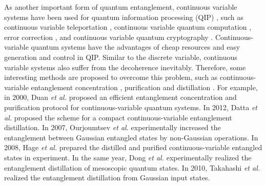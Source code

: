 \documentclass[preprintnumbers,showkeys,amsmath,amssymb]{revtex4}%
\begin{document}
As another important form of quantum entanglement, continuous
variable systems have been used for quantum information processing
(QIP) \cite{BraunsteinRMP77513}, such as continuous variable
teleportation \cite{VaidmanPRA1473,BraunsteinPRL869}, continuous
variable quantum computation \cite{LloydPRL1784}, error correction
\cite{BraunsteinNATURE394,LloydPRL4088}, and  continuous variable
quantum cryptography \cite{RalphPRA010302}. Continuous-variable
quantum systems have the advantages of cheap resources and easy
generation and control in QIP. Similar to the discrete variable,
continuous variable systems also suffer from the decoherence
inevitably. Therefore, some interesting methods are proposed to
overcome this problem, such as continuous-variable entanglement
concentration
\cite{LMDuanPRL2000,LMDuanPRA2000,Fiurasekpra022304,Menziespra042315,Menziespra062310,Tathampra14},
purification and distillation
\cite{LMDuanPRL2000,LMDuanPRA2000,Opatrnypra032302,Olivarespra032314,Dattaprl060502,Eisertny431,Kitagawapra042310,lundpra032309,Ourjoumtsevprl030502,HageNP915,DongNP919,
Takahashinp178}. For example, in 2000, Duan \emph{et al.}
\cite{LMDuanPRL2000} proposed an efficient entanglement
concentration and purification protocol for continuous-variable
quantum systems. In 2012, Datta \emph{et al.} \cite{Dattaprl060502}
proposed the scheme for a compact continuous-variable entanglement
distillation. In 2007, Ourjoumtsev \emph{et al.}
\cite{Ourjoumtsevprl030502} experimentally increased the
entanglement between Gaussian entangled states by non-Gaussian
operations. In 2008, Hage \emph{et al.} \cite{HageNP915} prepared
the distilled and purified continuous-variable entangled states in
experiment. In the same year, Dong \emph{et al.} \cite{DongNP919}
experimentally realized the entanglement distillation of mesoscopic
quantum states. In 2010, Takahashi \emph{et al.}
\cite{Takahashinp178} realized the entanglement distillation from
Gaussian input states.



\end{document}
